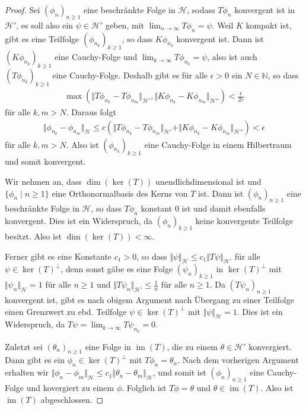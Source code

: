 \documentclass[11pt, hidelinks]{article}
\newcommand{\h}{\mathcal{H}}
\newcommand{\im}{\operatorname{im}}
\newcommand{\on}{{n \geq 1}}
\numberwithin{conj}{section}
\begin{document}
\begin{proof}
    Sei $(\phi_n)_{n \geq 1}$ eine beschränkte Folge in $\h$, sodass $T \phi_n$ konvergent ist in $\h'$, es soll also ein $\psi \in \h'$ geben, mit $\lim_{n\to\infty} T\phi_n = \psi$. Weil $K$ kompakt ist, gibt es eine Teilfolge $(\phi_{n_k})_{k \geq 1}$, so dass $K \phi_{n_k}$ konvergent ist. Dann ist $(K\phi_{n_k})_{k \geq 1}$ eine Cauchy-Folge und $\lim_{k\to\infty} T\phi_{n_k} = \psi$, also ist auch $(T\phi_{n_k})_{k \geq 1}$ eine Cauchy-Folge. Deshalb gibt es für alle $\epsilon > 0$ ein $N\in \mathbb{N}$, so dass
    \begin{align}
        \max(\Vert T\phi_{n_k}-T\phi_{n_m} \Vert_{\h'}, \Vert K\phi_{n_k}-K\phi_{n_m} \Vert_{\h''}) < \frac{\epsilon}{2c}
    \end{align}
    für alle $k,m > N$. Daraus folgt
    \begin{align}
        \Vert \phi_{n_k} - \phi_{n_m} \Vert_\h \leq c (\Vert T\phi_{n_k}-T\phi_{n_m} \Vert_{\h'} +  \Vert K\phi_{n_k}-K\phi_{n_m} \Vert_{\h''}) < \epsilon
    \end{align}
    für alle $k,m > N$. Also ist $(\phi_{n_k})_{k \geq 1}$ eine Cauchy-Folge in einem Hilbertraum und somit konvergent.

    Wir nehmen an, dass $\dim(\ker(T))$ unendlichdimensional ist und $\{\phi_n \;\vert\; n \geq 1\}$ eine Orthonormalbasis des Kerns von $T$ ist. Dann ist $(\phi_n)_{n \geq 1}$ eine beschränkte Folge in $\h$, so dass $T \phi_n$ konstant $0$ ist und damit ebenfalls konvergent. Dies ist ein Widerspruch, da $(\phi_n)_{k \geq 1}$ keine konvergente Teilfolge besitzt. Also ist $\dim(\ker(T)) < \infty$.

    Ferner gibt es eine Konstante $c_1 > 0$, so dass $\Vert \psi \Vert_\h \leq c_1 \Vert T\psi \Vert_{\h'}$ für alle $\psi \in \ker(T)^\perp$, denn sonst gäbe es eine Folge $(\psi_n)_{k \geq 1}$ in $\ker(T)^\perp$ mit $\Vert \psi_n \Vert_\h = 1$ für alle $n \geq 1$ und $\Vert T\psi_n \Vert_{\h'} \leq \frac{1}{n}$ für alle $n \geq 1$. Da $(T\psi_n)_\on$ konvergent ist, gibt es nach obigem Argument nach Übergang zu einer Teilfolge einen Grenzwert zu ebd. Teilfolge $\psi \in \ker(T)^\perp$ mit $\Vert \psi \Vert_\h = 1$. Dies ist ein Widerspruch, da $T \psi = \lim_{k\to\infty} T \psi_{n_k} = 0$.

    Zuletzt sei $(\theta_n)_{n \geq 1}$ eine Folge in $\im(T)$, die zu einem $\theta \in \h'$ konvergiert. Dann gibt es ein $\phi_n \in \ker(T)^\perp$ mit $T\phi_n = \theta_n$. Nach dem vorherigen Argument erhalten wir $\Vert\phi_n-\phi_m\Vert_\h \leq c_1 \Vert \theta_n - \theta_m \Vert_\h$, und somit ist $(\phi_n)_{n\geq 1}$ eine Cauchy-Folge und kovergiert zu einem $\phi$. Folglich ist $T\phi = \theta$ und $\theta \in \im(T)$. Also ist $\im(T)$ abgeschlossen.
\end{proof}
\end{document}
